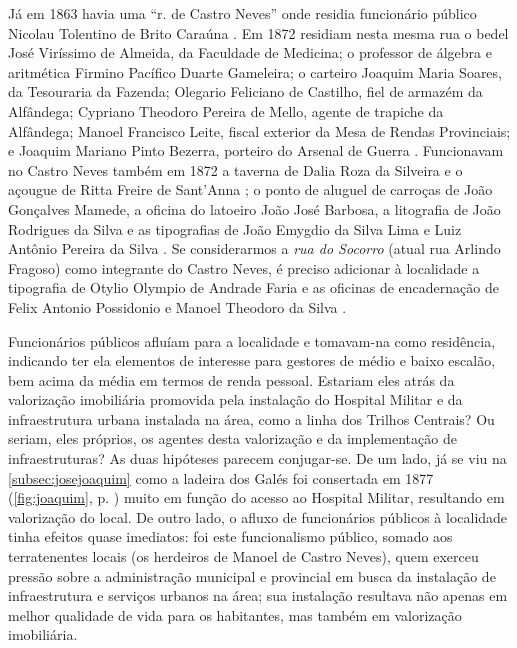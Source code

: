 Já em 1863 havia uma ``r. de Castro Neves'' onde residia funcionário público Nicolau Tolentino de Brito Caraúna \cite[p.~125]{masson_almanak_1863}. Em 1872 residiam nesta mesma rua o bedel José Viríssimo de Almeida, da Faculdade de Medicina; o professor de álgebra e aritmética Firmino Pacífico Duarte Gameleira; o carteiro Joaquim Maria Soares, da Tesouraria da Fazenda; Olegario Feliciano de Castilho, fiel de armazém da Alfândega; Cypriano Theodoro Pereira de Mello, agente de trapiche da Alfândega; Manoel Francisco Leite, fiscal exterior da Mesa de Rendas Provinciais; e Joaquim Mariano Pinto Bezerra, porteiro do Arsenal de Guerra \cite[segunda~parte, pp.~94, 96, 167, 170, 184, 194]{pimenta_almanak_1872}. Funcionavam no Castro Neves também em 1872 a taverna de Dalia Roza da Silveira e o açougue de Ritta Freire de Sant'Anna \cite[terceira~parte, pp.~41, 54]{pimenta_almanak_1872}; o ponto de aluguel de carroças de João Gonçalves Mamede, a oficina do latoeiro João José Barbosa, a litografia de João Rodrigues da Silva e as tipografias de João Emygdio da Silva Lima e Luiz Antônio Pereira da Silva \cite[quarta parte, pp.~20, 32, 36, 38]{pimenta_almanak_1872}. Se considerarmos a \textit{rua do Socorro} (atual rua Arlindo Fragoso) como integrante do Castro Neves, é preciso adicionar à localidade a tipografia de Otylio Olympio de Andrade Faria e as oficinas de encadernação de Felix Antonio Possidonio e Manoel Theodoro da Silva \cite[quarta parte, pp.~38, 39]{pimenta_almanak_1872}. 

Funcionários públicos afluíam para a localidade e tomavam-na como residência, indicando ter ela elementos de interesse para gestores de médio e baixo escalão, bem acima da média em termos de renda pessoal. Estariam eles atrás da valorização imobiliária promovida pela instalação do Hospital Militar e da infraestrutura urbana instalada na área, como a linha dos Trilhos Centrais? Ou seriam, eles próprios, os agentes desta valorização e da implementação de infraestruturas? As duas hipóteses parecem conjugar-se. De um lado, já se viu na \autoref{subsec:josejoaquim} como a ladeira dos Galés foi consertada em 1877 (\autoref{fig:joaquim}, p. \pageref{fig:joaquim}) muito em função do acesso ao Hospital Militar, resultando em valorização do local. De outro lado, o afluxo de funcionários públicos à localidade tinha efeitos quase imediatos: foi este funcionalismo público, somado aos terratenentes locais (os herdeiros de Manoel de Castro Neves), quem exerceu pressão sobre a administração municipal e provincial em busca da instalação de infraestrutura e serviços urbanos na área; sua instalação resultava não apenas em melhor qualidade de vida para os habitantes, mas também em valorização imobiliária. 

